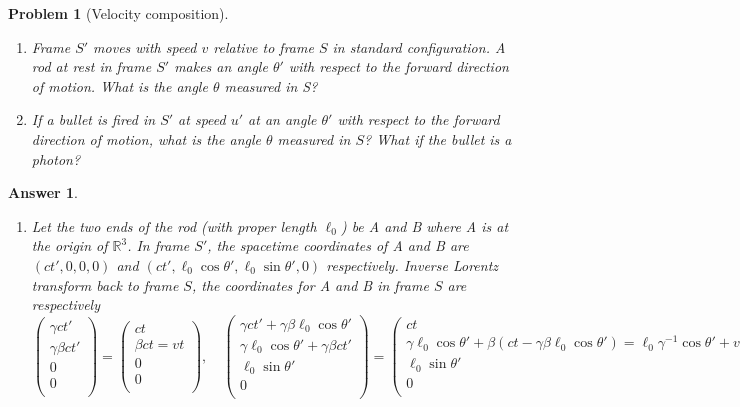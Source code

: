 \documentclass[a4paper]{article}
\theoremstyle{new2}
\newtheorem{ans}{Answer}[section]
\theoremstyle{new}
\newtheorem{qns}{Problem}[section]
\begin{document}
\begin{qns}[Velocity composition]\leavevmode
\begin{enumerate}[label=(\alph*)]
\item Frame $S'$ moves with speed $v$ relative to frame $S$ in standard configuration. A rod at rest in frame $S'$ makes an angle $\theta'$ with respect to the forward direction of motion. What is the angle $\theta$ measured in S?
\item If a bullet is fired in $S'$ at speed $u'$ at an angle $\theta'$ with respect to the forward direction of motion, what is the angle $\theta$ measured in $S$? What if the bullet is a photon?
\end{enumerate}
\end{qns}
\begin{ans}\leavevmode
\begin{enumerate}[label=(\alph*)]
\item Let the two ends of the rod (with proper length $\ell_0$) be A and B where A is at the origin of $\mathbb{R}^3$. In frame $S'$, the spacetime coordinates of A and B are $(ct',0,0,0)$ and $(ct',\ell_0\cos\theta',\ell_0\sin\theta',0)$ respectively. Inverse Lorentz transform back to frame $S$, the coordinates for A and B in frame $S$ are respectively
$$\begin{pmatrix}\gamma ct'\\\gamma\beta ct'\\0\\0\\\end{pmatrix}=\begin{pmatrix}ct\\\beta ct=vt\\0\\0\\\end{pmatrix},\quad\begin{pmatrix}\gamma ct'+\gamma\beta\ell_0\cos\theta'\\\gamma\ell_0\cos\theta'+\gamma\beta ct'\\\ell_0\sin\theta'\\0\\\end{pmatrix}=\begin{pmatrix}ct\\\gamma\ell_0\cos\theta'+\beta(ct-\gamma\beta\ell_0\cos\theta')=\ell_0\gamma^{-1}\cos\theta'+vt\\\ell_0\sin\theta'\\0\\\end{pmatrix}$$

\end{enumerate}
\end{ans}
\end{document}
